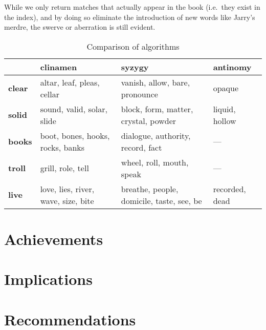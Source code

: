 While we only return matches that actually appear in the book (i.e.\ they exist in the index), and by doing so eliminate the introduction of new words like Jarry's merdre, the swerve or aberration is still evident.

\begin{table}[htb]
  \begin{tabu}{X[1,L]|X[3,L]X[3,L]X[2,L]}
  \toprule
  &
  \textbf{clinamen}
  &
  \textbf{syzygy}
  &
  \textbf{antinomy}
  \\ \midrule
  \textbf{clear}
  &
  altar, leaf, pleas, cellar
  &
  vanish, allow, bare, pronounce
  &
  opaque
  \\ \midrule
  \textbf{solid}
  &
  sound, valid, solar, slide
  &
  block, form, matter, crystal, powder
  &
  liquid, hollow
  \\ \midrule
  \textbf{books}
  &
  boot, bones, hooks, rocks, banks
  &
  dialogue, authority, record, fact
  &
  ---
  \\ \midrule
  \textbf{troll}
  &
  grill, role, tell
  &
  wheel, roll, mouth, speak
  &
  ---
  \\ \midrule
  \textbf{live}
  &
  love, lies, river, wave, size, bite
  &
  breathe, people, domicile, taste, see, be
  &
  recorded, dead
  \\ \bottomrule
  \end{tabu}
\caption[Comparison of algorithms]{Comparison of algorithms}
\label{algorithmscomp}
\end{table}



\section{Achievements}

\section{Implications}

\section{Recommendations}

\stopcontents[chapters]
